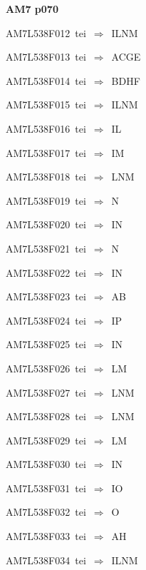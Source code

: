 \par\vfill\eject
{\bf\hfill AM7 p070\hfill\hbox{}}\par\bigskip
{\sixrm AM7L538F012\ {\sixit tei}\ }$\Rightarrow$\ ILNM\par\smallskip
{\sixrm AM7L538F013\ {\sixit tei}\ }$\Rightarrow$\ ACGE\par\smallskip
{\sixrm AM7L538F014\ {\sixit tei}\ }$\Rightarrow$\ BDHF\par\smallskip
{\sixrm AM7L538F015\ {\sixit tei}\ }$\Rightarrow$\ ILNM\par\smallskip
{\sixrm AM7L538F016\ {\sixit tei}\ }$\Rightarrow$\ IL\par\smallskip
{\sixrm AM7L538F017\ {\sixit tei}\ }$\Rightarrow$\ IM\par\smallskip
{\sixrm AM7L538F018\ {\sixit tei}\ }$\Rightarrow$\ LNM\par\smallskip
{\sixrm AM7L538F019\ {\sixit tei}\ }$\Rightarrow$\ N\par\smallskip
{\sixrm AM7L538F020\ {\sixit tei}\ }$\Rightarrow$\ IN\par\smallskip
{\sixrm AM7L538F021\ {\sixit tei}\ }$\Rightarrow$\ N\par\smallskip
{\sixrm AM7L538F022\ {\sixit tei}\ }$\Rightarrow$\ IN\par\smallskip
{\sixrm AM7L538F023\ {\sixit tei}\ }$\Rightarrow$\ AB\par\smallskip
{\sixrm AM7L538F024\ {\sixit tei}\ }$\Rightarrow$\ IP\par\smallskip
{\sixrm AM7L538F025\ {\sixit tei}\ }$\Rightarrow$\ IN\par\smallskip
{\sixrm AM7L538F026\ {\sixit tei}\ }$\Rightarrow$\ LM\par\smallskip
{\sixrm AM7L538F027\ {\sixit tei}\ }$\Rightarrow$\ LNM\par\smallskip
{\sixrm AM7L538F028\ {\sixit tei}\ }$\Rightarrow$\ LNM\par\smallskip
{\sixrm AM7L538F029\ {\sixit tei}\ }$\Rightarrow$\ LM\par\smallskip
{\sixrm AM7L538F030\ {\sixit tei}\ }$\Rightarrow$\ IN\par\smallskip
{\sixrm AM7L538F031\ {\sixit tei}\ }$\Rightarrow$\ IO\par\smallskip
{\sixrm AM7L538F032\ {\sixit tei}\ }$\Rightarrow$\ O\par\smallskip
{\sixrm AM7L538F033\ {\sixit tei}\ }$\Rightarrow$\ AH\par\smallskip
{\sixrm AM7L538F034\ {\sixit tei}\ }$\Rightarrow$\ ILNM\par\smallskip

